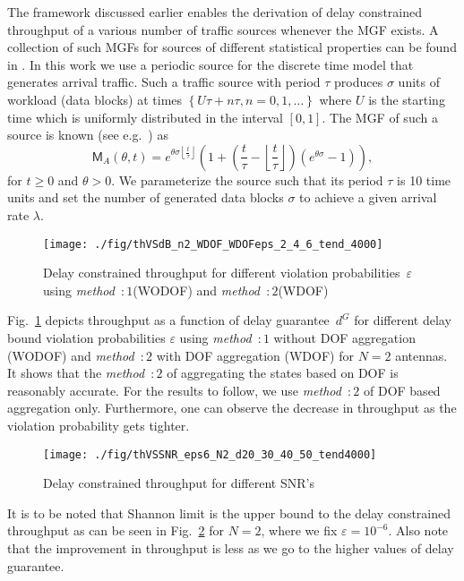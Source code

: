 \documentclass[10pt,conference]{IEEEtran}
\begin{document}
The framework discussed earlier enables the derivation of delay constrained throughput of a various number of traffic sources whenever the MGF exists. A collection of such MGFs for sources of different statistical properties can be found in \cite{EB:Kelly96}.
In this work we use a periodic source for the discrete time model that generates arrival traffic.
Such a traffic source with period $\tau$ produces $\sigma$ units of workload (data blocks) at times $\left\{U \tau + n \tau, n = 0,1,\ldots\right\}$ where $U$ is the starting time which is uniformly distributed  in the interval $[0,1]$. The MGF of such a source is known (see e.g.~\cite{EB:Kelly96}) as
\begin{equation}
	\mathsf{M}_{A}(\theta,t) = e^{\theta \sigma \left\lfloor \frac{t}{\tau}\right\rfloor} \left(1+\left(\frac{t}{\tau} - \left\lfloor \frac{t}{\tau}\right\rfloor\right)\left(e^{\theta \sigma} - 1\right)\right) ,	
\end{equation}
for $t \geq 0$ and $\theta > 0$.
We parameterize the source such that its period $\tau$ is 10 time units and set the number of generated data blocks $\sigma$ to achieve a given arrival rate $\lambda$.
\begin{figure}[t]
	\centering		 \texttt{[image: ./fig/thVSdB\_n2\_WDOF\_WDOFeps\_2\_4\_6\_tend\_4000]}
	\caption{Delay constrained throughput for different violation probabilities~$\varepsilon$ using \emph{method~$:1$}(WODOF) and \emph{method~$:2$}(WDOF) }
	\label{fig:thVSdb_N2}
\end{figure}


Fig.~\ref{fig:thVSdb_N2} depicts throughput as a function of delay guarantee~$d^{G}$ for different delay bound violation probabilities $\varepsilon$ using \emph{method~$:1$} without DOF aggregation (WODOF) and \emph{method~$:2$} with DOF aggregation (WDOF) for $N = 2$ antennas.
It shows that the \emph{method~$:2$} of aggregating the states based on DOF is reasonably accurate.
For the results to follow, we use \emph{method~$:2$} of DOF based aggregation only.
Furthermore, one can observe the decrease in throughput as the violation probability gets tighter.
\begin{figure}[t]
	\centering		 \texttt{[image: ./fig/thVSSNR\_eps6\_N2\_d20\_30\_40\_50\_tend4000]}
	\caption{Delay constrained throughput for different SNR's}
	\label{fig:thVSSNR_N2}
\end{figure}


It is to be noted that Shannon limit is the upper bound to the delay constrained throughput as can be seen in Fig.~\ref{fig:thVSSNR_N2} for $N = 2$, where we fix $\varepsilon = 10^{-6}$. Also note that the improvement in throughput is less as we go to the higher values of delay guarantee.
\end{document}
